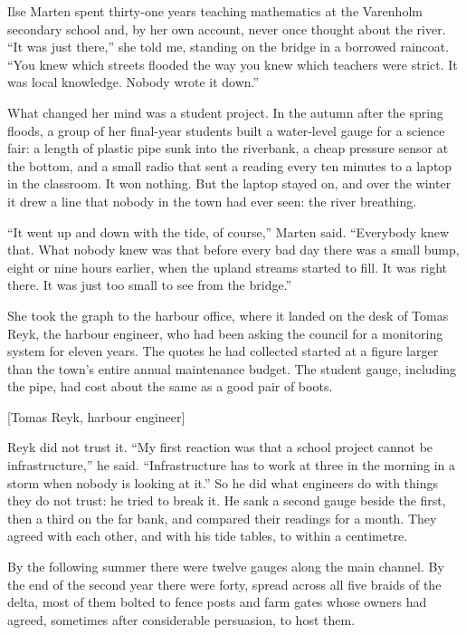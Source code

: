 \documentclass[theme=editorial,publication-type=feature-article]{reportkit}
\begin{document}
\begin{featurecolumns}
Ilse Marten spent thirty-one years teaching mathematics at the Varenholm secondary school and, by her own account, never once thought about the river. “It was just there,” she told me, standing on the bridge in a borrowed raincoat. “You knew which streets flooded the way you knew which teachers were strict. It was local knowledge. Nobody wrote it down.”

What changed her mind was a student project. In the autumn after the spring floods, a group of her final-year students built a water-level gauge for a science fair: a length of plastic pipe sunk into the riverbank, a cheap pressure sensor at the bottom, and a small radio that sent a reading every ten minutes to a laptop in the classroom. It won nothing. But the laptop stayed on, and over the winter it drew a line that nobody in the town had ever seen: the river breathing.

“It went up and down with the tide, of course,” Marten said. “Everybody knew that. What nobody knew was that before every bad day there was a small bump, eight or nine hours earlier, when the upland streams started to fill. It was right there. It was just too small to see from the bridge.”

She took the graph to the harbour office, where it landed on the desk of Tomas Reyk, the harbour engineer, who had been asking the council for a monitoring system for eleven years. The quotes he had collected started at a figure larger than the town's entire annual maintenance budget. The student gauge, including the pipe, had cost about the same as a good pair of boots.

[Tomas Reyk, harbour engineer]

Reyk did not trust it. “My first reaction was that a school project cannot be infrastructure,” he said. “Infrastructure has to work at three in the morning in a storm when nobody is looking at it.” So he did what engineers do with things they do not trust: he tried to break it. He sank a second gauge beside the first, then a third on the far bank, and compared their readings for a month. They agreed with each other, and with his tide tables, to within a centimetre.

By the following summer there were twelve gauges along the main channel. By the end of the second year there were forty, spread across all five braids of the delta, most of them bolted to fence posts and farm gates whose owners had agreed, sometimes after considerable persuasion, to host them.


\end{featurecolumns}
\end{document}
